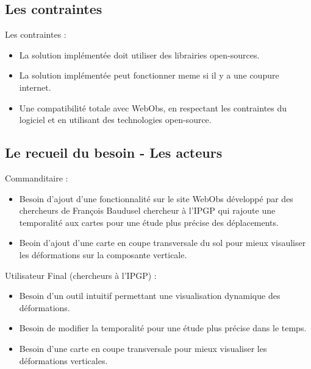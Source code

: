 \documentclass[11pt]{article}
\begin{document}
\subsection{Les contraintes}
Les contraintes :
\vspace{0,1cm}
\begin{itemize}
\vspace{0,1cm}
    \item La solution implémentée doit utiliser des librairies open-sources.
    \item La solution implémentée peut fonctionner meme si il y a une coupure internet.
    \item Une compatibilité totale avec WebObs, en respectant les contraintes du logiciel et en utilisant des technologies open-source.
   
\end{itemize}


\subsection{Le recueil du besoin - Les acteurs}
Commanditaire :
\vspace{0,1cm}


\begin{itemize}
\vspace{0,1cm}

    \item Besoin d'ajout d'une fonctionnalité sur le site WebObs développé par des chercheurs de François Baudusel chercheur à l'IPGP qui rajoute une temporalité aux cartes pour une étude plus précise des déplacements.
    \item Beoin d'ajout d'une carte en coupe transversale du sol pour mieux visauliser les déformations sur la composante verticale. 
\end{itemize}


\vspace{0,3cm}
Utilisateur Final (chercheurs à l'IPGP) :
\vspace{0,1cm}
\begin{itemize}

    \item Besoin d'un outil intuitif permettant une visualisation dynamique des déformations.
    \item Besoin de modifier la temporalité pour une étude plus précise dans le temps.
    \item Besoin d'une carte en coupe transversale pour mieux visualiser les déformations verticales.
\end{itemize} 
\end{document}
